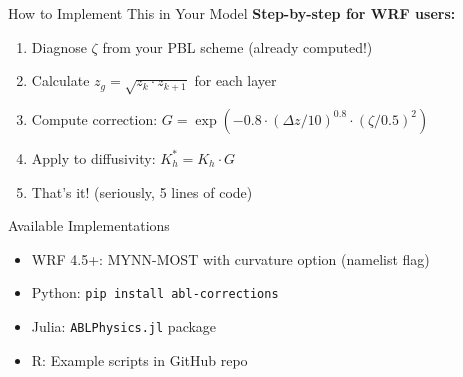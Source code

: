 \documentclass[10pt,aspectratio=169]{beamer}
\begin{document}
\begin{frame}{How to Implement This in Your Model}
  \textbf{Step-by-step for WRF users:}
  
  \begin{enumerate}
    \item Diagnose $\zeta$ from your PBL scheme (already computed!)
    \item Calculate $z_g = \sqrt{z_k \cdot z_{k+1}}$ for each layer
    \item Compute correction: $G = \exp(-0.8 \cdot (\Delta z/10)^{0.8} \cdot (\zeta/0.5)^2)$
    \item Apply to diffusivity: $K_h^* = K_h \cdot G$
    \item \alert{That's it!} (seriously, 5 lines of code)
  \end{enumerate}
  
  \vspace{0.5cm}
  \begin{block}{Available Implementations}
    \begin{itemize}
      \item WRF 4.5+: MYNN-MOST with curvature option (namelist flag)
      \item Python: \texttt{pip install abl-corrections}
      \item Julia: \texttt{ABLPhysics.jl} package
      \item R: Example scripts in GitHub repo
    \end{itemize}
  \end{block}
\end{frame}
\end{document}
